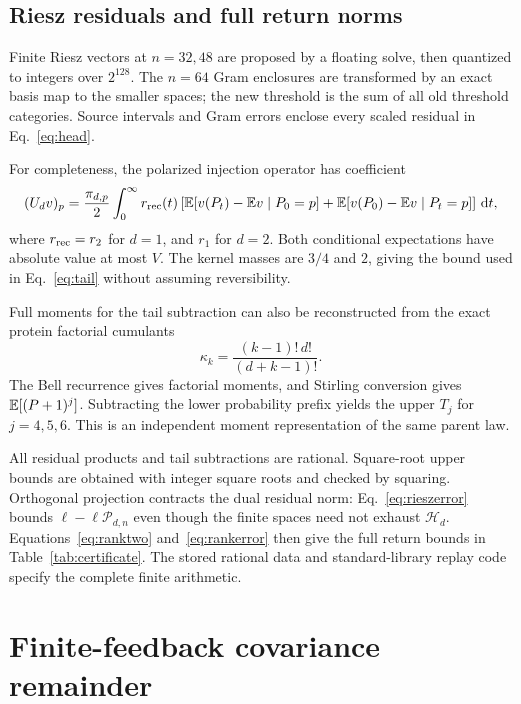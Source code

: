 \subsection{Riesz residuals and full return norms}

Finite Riesz vectors at $n=32,48$ are proposed by a floating solve,
then quantized to integers over $2^{128}$. The $n=64$ Gram enclosures
are transformed by an exact basis map to the smaller spaces; the
new threshold is the sum of all old threshold categories.
Source intervals and Gram errors enclose every scaled residual
in Eq.~\eqref{eq:head}.

For completeness, the polarized injection operator has coefficient
\begin{equation}
 (U_dv)_p=\frac{\pi_{d,p}}2\int_0^\infty r_{\rm rec}(t)
 \left[
 \mathbb E[v(P_t)-\mathbb E v\mid P_0=p]
 +\mathbb E[v(P_0)-\mathbb E v\mid P_t=p]
 \right]\,\mathrm dt ,
\end{equation}
where $r_{\rm rec}=r_2$ for $d=1$, and $r_1$ for $d=2$.
Both conditional expectations have absolute value at most $V$.
The kernel masses are $3/4$ and $2$, giving the bound used
in Eq.~\eqref{eq:tail} without assuming reversibility.

Full moments for the tail subtraction can also be reconstructed from
the exact protein factorial cumulants
\begin{equation}
 \kappa_k=\frac{(k-1)!\,d!}{(d+k-1)!}.
\end{equation}
The Bell recurrence gives factorial moments, and Stirling conversion
gives $\mathbb E[(P+1)^j]$. Subtracting the lower probability prefix yields
the upper $T_j$ for $j=4,5,6$. This is an independent moment
representation of the same parent law.

All residual products and tail subtractions are rational. Square-root
upper bounds are obtained with integer square roots and checked by
squaring. Orthogonal projection contracts the dual residual norm:
Eq.~\eqref{eq:rieszerror} bounds
$\ell-\ell\mathcal P_{d,n}$ even though the finite spaces need not
exhaust $\mathcal H_d$. Equations~\eqref{eq:ranktwo}
and~\eqref{eq:rankerror} then give the full return bounds in
Table~\ref{tab:certificate}. The stored rational data and
standard-library replay code specify the complete finite arithmetic.

\section{Finite-feedback covariance remainder}
\label{app:remainder}

